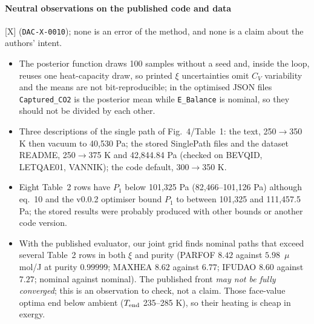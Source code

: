 \documentclass[10pt]{article}
\newcommand{\tier}[1]{\textsf{[#1]}}
\newcommand{\tX}{\tier{X}}
\newcommand{\id}[1]{\texttt{DAC-#1}}
\newcommand{\umolJ}{\ensuremath{\mu}mol/J}
\begin{document}
\paragraph{Neutral observations on the published code and data}\label{sec:obs}\tX{} (\id{X-0010}); none is an error of the method, and none is a claim about the authors' intent.
\begin{itemize}\itemsep=0pt
\item The posterior function draws 100 samples without a seed and, inside the loop, reuses one heat-capacity draw, so printed $\xi$ uncertainties omit $C_V$ variability and the means are not bit-reproducible; in the optimised JSON files \texttt{Captured\_CO2} is the posterior mean while \texttt{E\_Balance} is nominal, so they should not be divided by each other.
\item Three descriptions of the single path of Fig.~4/Table~1: the text, 250$\to$350 K then vacuum to 40,530 Pa; the stored SinglePath files and the dataset README, 250$\to$375 K and 42,844.84 Pa (checked on BEVQID, LETQAE01, VANNIK); the code default, 300$\to$350 K.
\item Eight Table~2 rows have $P_1$ below 101,325 Pa (82,466--101,126 Pa) although eq.~10 and the v0.0.2 optimiser bound $P_1$ to between 101,325 and 111,457.5 Pa; the stored results were probably produced with other bounds or another code version.
\item With the published evaluator, our joint grid finds nominal paths that exceed several Table~2 rows in both $\xi$ and purity (PARFOF $8.42$ against $5.98$~\umolJ{} at purity $0.99999$; MAXHEA $8.62$ against $6.77$; IFUDAO $8.60$ against $7.27$; nominal against nominal). The published front \emph{may not be fully converged}; this is an observation to check, not a claim. Those face-value optima end below ambient ($T_{\rm end}$ 235--285 K), so their heating is cheap in exergy.
\end{itemize}

\end{document}
